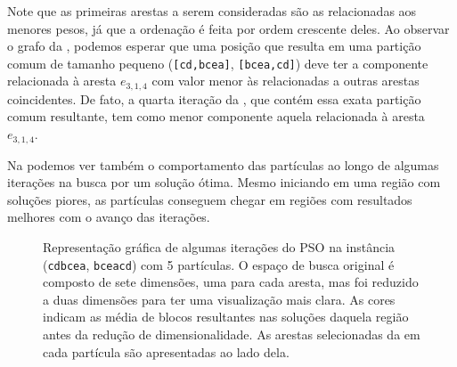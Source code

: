     \newpage

    Note que as primeiras arestas a serem consideradas são as relacionadas aos menores pesos, já que a ordenação é feita por ordem crescente deles. Ao observar o grafo da , podemos esperar que uma posição que resulta em uma partição comum de tamanho pequeno (\texttt{[cd,bcea]}, \texttt{[bcea,cd]}) deve ter a componente relacionada à aresta $e_{3,1,4}$ com valor menor às relacionadas a outras arestas coincidentes. De fato, a quarta iteração da , que contém essa exata partição comum resultante, tem como menor componente aquela relacionada à aresta $e_{3,1,4}$.

    Na  podemos ver também o comportamento das partículas ao longo de algumas iterações na busca por um solução ótima. Mesmo iniciando em uma região com soluções piores, as partículas conseguem chegar em regiões com resultados melhores com o avanço das iterações.

    \begin{figure}[htb]
        \centering
        \newcommand{\mathdefault}[1][]{}


        \caption{Representação gráfica de algumas iterações do PSO na instância (\texttt{cdbcea}, \texttt{bceacd}) com 5 partículas. O espaço de busca original é composto de sete dimensões, uma para cada aresta, mas foi reduzido a duas dimensões para ter uma visualização mais clara. As cores indicam as média de blocos resultantes nas soluções daquela região antes da redução de dimensionalidade. As arestas selecionadas da  em cada partícula são apresentadas ao lado dela.}
        \label{fig:pso-iter-example}
    \end{figure}
